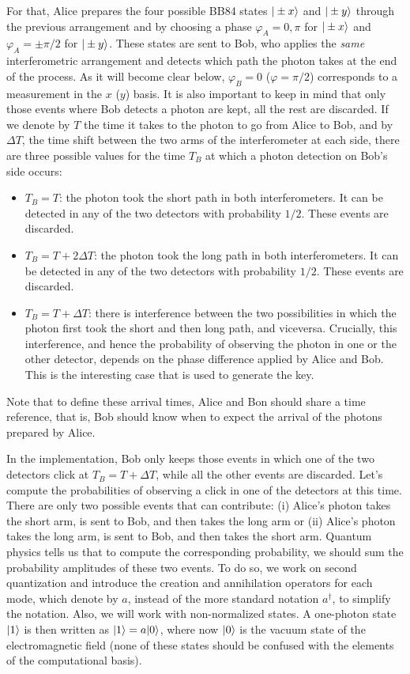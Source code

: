 \documentclass[a4paper]{article}
\begin{document}
For that, Alice prepares the four possible BB84 states $|\pm x\rangle$ and $|\pm y\rangle$ through the previous arrangement and by choosing a phase $\varphi_A=0,\pi$ for $|\pm x\rangle$ and $\varphi_A=\pm\pi/2$ for $|\pm y\rangle$. These states are sent to Bob, who applies the \emph{same} interferometric arrangement and detects which path the photon takes at the end of the process. As it will become clear below, $\varphi_B=0$ ($\varphi=\pi/2$) corresponds to a measurement in the $x$ ($y$) basis. It is also important to keep in mind that only those events where Bob detects a photon are kept, all the rest are discarded. If we denote by $T$ the time it takes to the photon to go from Alice to Bob, and by $\Delta T$, the time shift between the two arms of the interferometer at each side, there are three possible values for the time $T_B$ at which a photon detection on Bob's side occurs:
\begin{itemize}
\item $T_B=T$: the photon took the short path in both interferometers. It can be detected in any of the two detectors with probability $1/2$. These events are discarded.
\item $T_B=T+2\Delta T$: the photon took the long path in both interferometers. It can be detected in any of the two detectors with probability $1/2$. These events are discarded.
\item $T_B=T+\Delta T$: there is interference between the two possibilities in which the photon first took the short and then long path, and viceversa. Crucially, this interference, and hence the probability of observing the photon in one or the other detector, depends on the phase difference applied by Alice and Bob. This is the interesting case that is used to generate the key.
\end{itemize}
Note that to define these arrival times, Alice and Bon should share a time reference, that is, Bob should know when to expect the arrival of the photons prepared by Alice.

In the implementation, Bob only keeps those events in which one of the two detectors click at $T_B=T+\Delta T$, while all the other events are discarded. Let's compute the probabilities of observing a click in one of the detectors at this time. There are only two possible events that can contribute: (i) Alice's photon takes the short arm, is sent to Bob, and then takes the long arm or (ii) Alice's photon takes the long arm, is sent to Bob, and then takes the short arm. Quantum physics tells us that to compute the corresponding probability, we should sum the probability amplitudes of these two events. To do so, we work on second quantization and introduce the creation and annihilation operators for each mode, which denote by $a$, instead of the more standard notation $a^\dagger$, to simplify the notation. Also, we will work with non-normalized states. A one-photon state $|1\rangle$ is then written as $|1\rangle=a|0\rangle$, where now $|0\rangle$ is the vacuum state of the electromagnetic field (none of these states should be confused with the elements of the computational basis).
\end{document}
